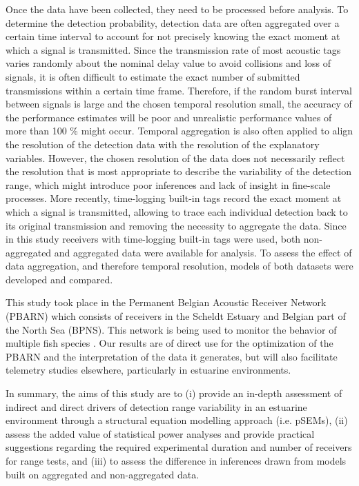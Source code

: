 \documentclass[doublespacing,linenumbers]{bmcart}
\begin{document}
Once the data have been collected, they need to be processed before analysis. To determine the detection probability, detection data are often aggregated over a certain time interval to account for not precisely knowing the exact moment at which a signal is transmitted. Since the transmission rate of most acoustic tags varies randomly about the nominal delay value to avoid collisions and loss of signals, it is often difficult to estimate the exact number of submitted transmissions within a certain time frame. Therefore, if the random burst interval between signals is large and the chosen temporal resolution small, the accuracy of the performance estimates will be poor and unrealistic performance values of more than 100 \% might occur. Temporal aggregation is also often applied to align the resolution of the detection data with the resolution of the explanatory variables. However, the chosen resolution of the data does not necessarily reflect the resolution that is most appropriate to describe the variability of the detection range, which might introduce poor inferences and lack of insight in fine-scale processes. More recently, time-logging built-in tags record the exact moment at which a signal is transmitted, allowing to trace each individual detection back to its original transmission and removing the necessity to aggregate the data. Since in this study receivers with time-logging built-in tags were used, both non-aggregated \cite{Cimino2018DetectionGliders,Goossens2020MooringReceivers} and aggregated data \cite{Selby2016CanHabitat,Reubens2018,OBrien2021InfluenceBight} were available for analysis. To assess the effect of data aggregation, and therefore temporal resolution, models of both datasets were developed and compared. 

This study took place in the Permanent Belgian Acoustic Receiver Network (PBARN) which consists of receivers in the Scheldt Estuary and Belgian  part  of  the  North  Sea  (BPNS). This network is being used to monitor the behavior of multiple fish species \cite{ReubensBPNS}. Our results are of direct use for the optimization of the PBARN and the interpretation of the data it generates, but will also facilitate telemetry studies elsewhere, particularly in estuarine environments. 

In summary, the aims of this study are to (i) provide an in-depth assessment of indirect and direct drivers of detection range variability in an estuarine environment through a structural equation modelling approach (i.e. pSEMs), (ii) assess the added value of statistical power analyses and provide practical suggestions regarding the required experimental duration and number of receivers for range tests, and (iii) to assess the difference in inferences drawn from models built on aggregated and non-aggregated data.    
\end{document}
